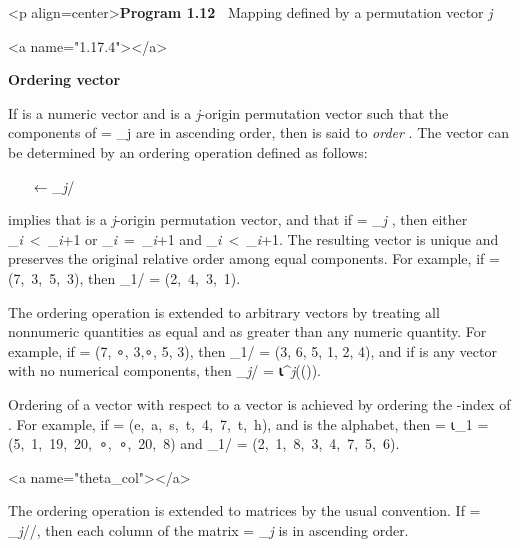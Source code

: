 <p align=center>\textbf{Program 1.12\ } Mapping defined by a permutation vector \textit{j}



<a name="1.17.4"></a>
\par \textbf{Ordering vector}

\par If  is a numeric vector and
 is a \textit{j}-origin permutation vector such that the components of  = 
 \int_{j}  are in ascending order, then  is said to \textit{order} . The vector  can be determined by an ordering operation defined as follows:

\par \ \ \  ← 
\textit{\theta}_{\textit{j}}/

\par implies that  is a \textit{j}-origin permutation vector, and that if 
 =  \int_{\textit{j}}
, then either
_{\textit{i}}\ <\ _{\textit{i}+1} or 
_{\textit{i}}\ =\ _{\textit{i}+1} and
_{\textit{i}}\ <\ _{\textit{i}+1}. The resulting vector  is unique and preserves the original relative order among equal components. For example, if
 = (7,\ 3,\ 5,\ 3), then \textit{\theta}_{1}/ = (2,\ 4,\ 3,\ 1).

\par The ordering operation is extended to arbitrary vectors by treating all nonnumeric quantities as equal and as greater than any numeric quantity. For example, if  = 
(7, ∘, 3,∘, 5, 3), then \textit{\theta}_{1}/ =
(3, 6, 5, 1, 2, 4), and if  is any vector with no numerical components, then 
\textit{\theta}_{\textit{j}}/ = 
\textbf{⍳}^{\textit{j}}(\textit{\nu}()).

\par Ordering of a vector  with respect to a vector  is achieved by ordering the -index of . For example, if  = (e,\ a,\ s,\ t,\ 4,\ 7,\ t,\ h), and  is the alphabet, then 
 =  ⍳_{1}
 = (5,\ 1,\ 19,\ 20,\ ∘,\ ∘,\ 20,\ 8) and \textit{\theta}_{1}/ = (2,\ 1,\ 8,\ 3,\ 4,\ 7,\ 5,\ 6).

<a name="theta_col"></a>
\par The ordering operation is extended to matrices by the usual convention. If  = 
\textit{\theta}_{\textit{j}}//, then each column of the matrix 
 =  \int\int_{\textit{j}}  is in ascending order.
\\\ 



